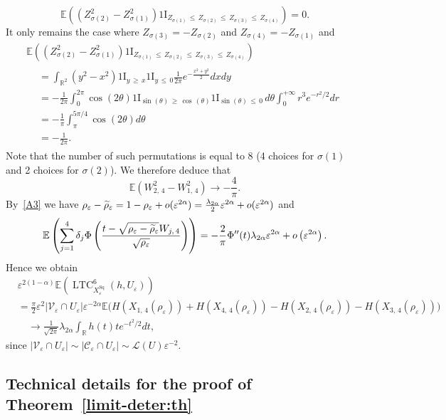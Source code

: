 \documentclass[10pt]{amsart}
\theoremstyle{definition}\newtheorem{defi}[theo]{Definition}\newtheorem{rema}[theo]{Remark}\newtheorem{exam}[theo]{Example}\newtheorem{exem}[theo]{Example}\newtheorem{nota}[theo]{Notation}
\newcommand{\R}{\mathbb{R}}
\newcommand{\E}{\mathbb{E}}
\newcommand{\ind}{{1\!\!\mathrm{I}}}
\newcommand{\eps}{\varepsilon}
\DeclareMathOperator{\LTC}{LTC}
\DeclareMathOperator{\Sq}{Sq}
\newcommand{\calL}{\mathcal{L}}
\newcommand{\calC}{\mathcal{C}}
\newcommand{\calV}{\mathcal{V}}
\let\oldtilde\tilde
\renewcommand*{\tilde}[1]{\mathchoice{\widetilde{#1}}{\widetilde{#1}}{\oldtilde{#1}}{\oldtilde{#1}}}
\begin{document}
\[
\E\left(\left(Z_{\sigma(2)}^2-Z_{\sigma(1)}^2\right)\ind_{Z_{\sigma(1)}\,\le\,Z_{\sigma(2)}\,\le\,Z_{\sigma(3)}\,\le\,Z_{\sigma(4)}}\right)=0.
\]
It only remains the case where $Z_{\sigma(3)}=-Z_{\sigma(2)}$ and $Z_{\sigma(4)}=-Z_{\sigma(1)}$ and
\begin{multline*}
\E\left(\left(Z_{\sigma(2)}^2-Z_{\sigma(1)}^2\right)\ind_{Z_{\sigma(1)}\,\le\,Z_{\sigma(2)}\,\le\,Z_{\sigma(3)}\,\le\,Z_{\sigma(4)}}\right)\\
\begin{aligned}
&=\int_{\R^2}\left(y^2-x^2\right)\ind_{y\,\ge\,x}\ind_{y\,\le\,0}\frac{1}{2\pi}e^{-\frac{x^2+y^2}{2}}dxdy\\
&=-\frac{1}{2\pi}\int_0^{2\pi}\cos(2\theta)\ind_{\sin(\theta)\,\ge\,\cos\,(\theta)}\ind_{\sin(\theta)\,\le\,0}\,d\theta\int_0^{+\infty}r^3e^{-r^2/2}dr\\
&=-\frac{1}{\pi}\int_{\pi}^{5\pi/4}\cos(2\theta)d\theta\\
&=-\frac{1}{2\pi}.
\end{aligned}
\end{multline*}
Note that the number of such permutations is equal to $8$ (4 choices for $\sigma(1)$ and 2 choices for $\sigma(2)$). We therefore deduce that
\[
\E\left(W_{2,\,4}^2-W_{1,\,4}^2\right)
\longrightarrow -\frac{4}{\pi}.
\]
By~\eqref{A3} we have $\rho_\eps-\tilde{\rho}_\eps=1-\rho_\eps+o(\eps^{2\alpha})=\frac{\lambda_{{2\alpha}}}{2}\eps^{2\alpha}+o(\eps^{2\alpha})$ and
\[
\E\left(\sum_{j=1}^{4}\delta_j
\Phi\left(\frac{t-\sqrt{\rho_\eps-\tilde{\rho}_\eps}W_{j,\,4}}{\sqrt{\rho_\eps}}\right)\right)
= -\frac{2}{\pi}\Phi''(t)\lambda_{{2\alpha}}\eps^{2\alpha}+o\left(\eps^{2\alpha}\right).
\]
Hence we obtain
\begin{align*}
&\eps^{2(1-\alpha)}\E\left(\LTC^6_{X_\eps^{\Sq}}(h,U_\eps)\right)\\
&=\frac{\pi}{2}\eps^2\left|\calV_\eps\cap U_\eps\right|
\eps^{-2\alpha}\E\big(H\left(X_{1,\,4}(\rho_\eps)\right)+H\left(X_{4,\,4}(\rho_\eps)\right)-H\left(X_{2,\,4}(\rho_\eps)\right)-H\left(X_{3,\,4}(\rho_\eps)\right)\big)\\
&\quad\longrightarrow\frac{1}{\sqrt{2\pi}}\lambda_{{2\alpha}}\int_{\R}h(t)te^{-t^2/2}dt,
\end{align*}
since $|\calV_\eps\cap U_\eps|\sim |\calC_\eps\cap U_\eps|\sim {\calL}(U)\eps^{-2}$.


\subsection{Technical details for the proof of Theorem~\ref{limit-deter:th}}\label{app:limit-deter:th}
\end{document}
